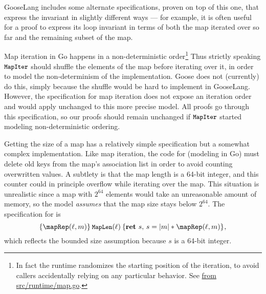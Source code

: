 GooseLang includes some alternate specifications, proven on top of this one, that
express the invariant in slightly different ways --- for example, it is often
useful for a proof to express its loop invariant in terms of both the map
iterated over so far and the remaining subset of the map.

Map iteration in Go happens in a non-deterministic order\footnote{In fact the
runtime randomizes the starting position of the iteration, to avoid callers
accidentally relying on any particular behavior. See
\href{https://github.com/golang/go/blob/c379c3d58d5482f4c8fe97466a99ce70e630ad44/src/runtime/map.go\#L844-L850}%
{ from src/runtime/map.go}.}
Thus strictly speaking $\cc{MapIter}$ should shuffle the elements of the map
before iterating over it, in order to model the non-determinism of the
implementation. Goose does not (currently) do this, simply because the shuffle would
be hard to implement in GooseLang. However, the specification for map iteration
does not expose an iteration order and would apply unchanged to this more
precise model. All proofs go through this specification, so our proofs should
remain unchanged if $\cc{MapIter}$ started modeling non-deterministic ordering.

Getting the size of a map has a relatively simple specification but a somewhat
complex implementation. Like map iteration, the code for  (modeling
 in Go) must delete old keys from the map's association list in order
to avoid counting overwritten values. A subtlety is that the map length is a
64-bit integer, and this counter could in principle overflow while iterating
over the map. This situation is unrealistic since a map with $2^{64}$ elements
would take an unreasonable amount of memory, so the model \emph{assumes} that
the map size stays below $2^{64}$. The specification for  is
\[
\hoare{\mapRep(\ell, m)}{\cc{MapLen}(\ell)}{\Ret{s} s = |m| * \mapRep(\ell, m)},
\]
which reflects
the bounded size assumption because $s$ is a 64-bit integer.
